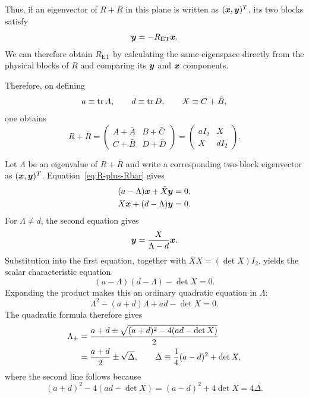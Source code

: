 Thus, if an eigenvector of $R+\overline R$ in this plane is written as
$(\bm{x},\bm{y})^T$, its two blocks satisfy
\begin{equation}
 \bm{y}=-R_{\mathrm{ET}}\bm{x}.
 \label{eq:ret-as-modal-plane-slope}
\end{equation}
We can therefore obtain $R_{\mathrm{ET}}$ by calculating the same eigenspace
directly from the physical blocks of $R$ and comparing its $\bm{y}$ and
$\bm{x}$ components.

Therefore, on defining
\begin{equation}
 a\equiv\operatorname{tr} A,
 \qquad d\equiv\operatorname{tr} D,
 \qquad X\equiv C+\bar B,
 \label{eq:et-a-d-X}
\end{equation}
one obtains
\begin{equation}
 R+\overline R
 =\begin{pmatrix}
   A+\bar A&B+\bar C\\
   C+\bar B&D+\bar D
  \end{pmatrix}
 =\begin{pmatrix}
   aI_2&\bar X\\X&dI_2
  \end{pmatrix}.
 \label{eq:R-plus-Rbar}
\end{equation}

Let $\Lambda$ be an eigenvalue of $R+\overline R$ and write a corresponding
two-block eigenvector as $(\bm{x},\bm{y})^T$.  Equation~\eqref{eq:R-plus-Rbar}
gives
\begin{align}
 (a-\Lambda)\bm{x}+\bar X\bm{y}&=0,
 \label{eq:et-eigenvector-upper}\\
 X\bm{x}+(d-\Lambda)\bm{y}&=0.
 \label{eq:et-eigenvector-lower}
\end{align}
For $\Lambda\ne d$, the second equation gives
\begin{equation}
 \bm{y}=\frac{X}{\Lambda-d}\bm{x}.
 \label{eq:y-from-x-et}
\end{equation}
Substitution into the first equation, together with
$\bar X X=(\det X)I_2$, yields the scalar characteristic equation
\begin{equation}
 (a-\Lambda)(d-\Lambda)-\det X=0.
 \label{eq:et-lambda-characteristic}
\end{equation}
Expanding the product makes this an ordinary quadratic equation in
$\Lambda$:
\begin{equation}
 \Lambda^2-(a+d)\Lambda+ad-\det X=0.
 \label{eq:et-lambda-quadratic}
\end{equation}
The quadratic formula therefore gives
\begin{align}
 \Lambda_{\pm}
 &=\frac{a+d\mathbin{\pm}
  \sqrt{(a+d)^2-4(ad-\det X)}}{2} \notag\\
 &=\frac{a+d}{2}\mathbin{\pm}\sqrt{\Delta},
 \qquad
 \Delta\equiv\frac14(a-d)^2+\det X,
 \label{eq:et-delta}
\end{align}
where the second line follows because
\begin{equation}
 (a+d)^2-4(ad-\det X)
 =(a-d)^2+4\det X
 =4\Delta.
 \label{eq:et-discriminant}
\end{equation}

